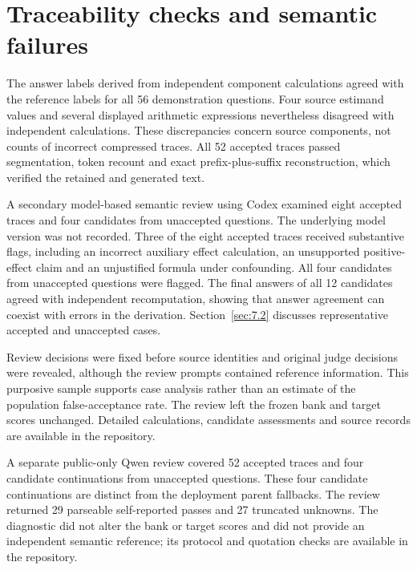 \section{Traceability checks and semantic failures}\label{sec:5.3}

The answer labels derived from independent component calculations agreed with the reference labels for all 56 demonstration questions. Four source estimand values and several displayed arithmetic expressions nevertheless disagreed with independent calculations. These discrepancies concern source components, not counts of incorrect compressed traces. All 52 accepted traces passed segmentation, token recount and exact prefix-plus-suffix reconstruction, which verified the retained and generated text.

A secondary model-based semantic review using Codex examined eight accepted traces and four candidates from unaccepted questions. The underlying model version was not recorded. Three of the eight accepted traces received substantive flags, including an incorrect auxiliary effect calculation, an unsupported positive-effect claim and an unjustified formula under confounding. All four candidates from unaccepted questions were flagged. The final answers of all 12 candidates agreed with independent recomputation, showing that answer agreement can coexist with errors in the derivation. Section~\ref{sec:7.2} discusses representative accepted and unaccepted cases.

Review decisions were fixed before source identities and original judge decisions were revealed, although the review prompts contained reference information. This purposive sample supports case analysis rather than an estimate of the population false-acceptance rate. The review left the frozen bank and target scores unchanged. Detailed calculations, candidate assessments and source records are available in the repository.

A separate public-only Qwen review covered 52 accepted traces and four candidate continuations from unaccepted questions. These four candidate continuations are distinct from the deployment parent fallbacks. The review returned 29 parseable self-reported passes and 27 truncated unknowns. The diagnostic did not alter the bank or target scores and did not provide an independent semantic reference; its protocol and quotation checks are available in the repository.
